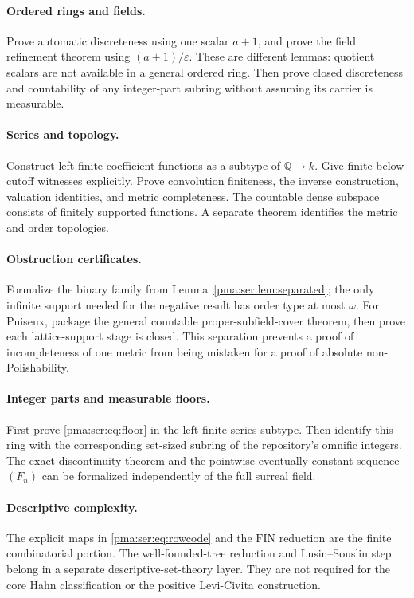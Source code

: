 \documentclass[11pt]{article}
\numberwithin{equation}{section}
\theoremstyle{definition}
\theoremstyle{remark}
\newcommand{\Q}{\mathbb Q}
\newcommand{\FIN}{\mathrm{FIN}}
\begin{document}
\paragraph{Ordered rings and fields.}
Prove automatic discreteness using one scalar $a+1$, and prove the field
refinement theorem using $(a+1)/\varepsilon$. These are different lemmas:
quotient scalars are not available in a general ordered ring.
Then prove closed discreteness and countability of any integer-part subring
without assuming its carrier is measurable.

\paragraph{Series and topology.}
Construct left-finite coefficient functions as a subtype of $\Q\to k$.
Give finite-below-cutoff witnesses explicitly. Prove convolution finiteness,
the inverse construction, valuation identities, and metric completeness.
The countable dense subspace consists of finitely supported functions.
A separate theorem identifies the metric and order topologies.

\paragraph{Obstruction certificates.}
Formalize the binary family from Lemma~\ref{pma:ser:lem:separated}; the only infinite
support needed for the negative result has order type at most $\omega$.
For Puiseux, package the general countable proper-subfield-cover theorem,
then prove each lattice-support stage is closed. This separation prevents a
proof of incompleteness of one metric from being mistaken for a proof of
absolute non-Polishability.

\paragraph{Integer parts and measurable floors.}
First prove \eqref{pma:ser:eq:floor} in the left-finite series subtype. Then identify
this ring with the corresponding set-sized subring of the repository's
omnific integers. The exact discontinuity theorem and the pointwise eventually
constant sequence $(F_n)$ can be formalized independently of the full surreal
field.

\paragraph{Descriptive complexity.}
The explicit maps in \eqref{pma:ser:eq:rowcode} and the $\FIN$ reduction are the
finite combinatorial portion. The well-founded-tree reduction and
Lusin--Souslin step belong in a separate descriptive-set-theory layer.
They are not required for the core Hahn classification or the positive
Levi-Civita construction.
\end{document}
